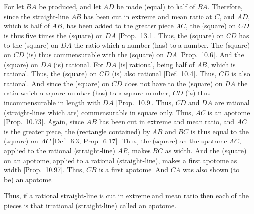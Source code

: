 \begin{Parallel}{}{}
{For let $BA$ be produced, and let $AD$ be made (equal) to
half of $BA$. Therefore, since the straight-line $AB$ has been cut in
extreme and mean ratio at $C$, and $AD$, which is half of $AB$, has been added to the greater piece $AC$, the (square) on $CD$ is thus 
five times the (square) on $DA$ [Prop.~13.1]. Thus, the (square) on $CD$
has to the (square) on $DA$ the ratio which a number (has) to a number.
The (square) on $CD$ (is) thus commensurable with the (square) on
$DA$ [Prop.~10.6]. And the (square) on $DA$ (is) rational.
For $DA$ [is] rational, being half of $AB$, which is rational.
Thus, the (square) on $CD$ (is) also rational [Def.~10.4]. 
Thus, $CD$ is also rational. And since the (square) on $CD$ does not have to
the (square) on $DA$ the ratio which a square number (has) to a square
number, $CD$ (is) thus incommensurable in length with $DA$ [Prop.~10.9].
Thus, $CD$  and $DA$ are rational (straight-lines which are) commensurable in square only. Thus, $AC$ is an apotome [Prop.~10.73].  Again, since
$AB$ has been cut in extreme and mean ratio, and $AC$ is the greater
piece, the (rectangle contained) by $AB$ and $BC$ is thus equal
to the (square) on $AC$ [Def.~6.3, Prop.~6.17]. Thus, the (square) on
the apotome $AC$, applied to the rational (straight-line) $AB$, makes $BC$
as width. And the (square) on an apotome, applied to a rational
(straight-line), makes a first apotome as width [Prop.~10.97].
Thus, $CB$ is a first apotome. And $CA$ was also
shown (to be) an apotome.

Thus, if a rational straight-line is cut in extreme and mean ratio then each of
the pieces is that irrational (straight-line) called an apotome.}
\end{Parallel}

